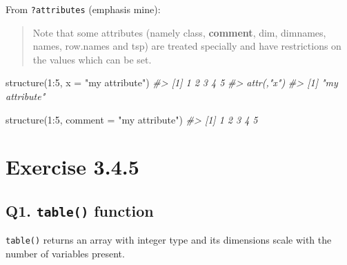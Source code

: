 \documentclass[
]{book}
\newenvironment{Shaded}{\begin{snugshade}}{\end{snugshade}}
\newcommand{\AttributeTok}[1]{\textcolor[rgb]{0.77,0.63,0.00}{#1}}
\newcommand{\CommentTok}[1]{\textcolor[rgb]{0.56,0.35,0.01}{\textit{#1}}}
\newcommand{\DecValTok}[1]{\textcolor[rgb]{0.00,0.00,0.81}{#1}}
\newcommand{\FunctionTok}[1]{\textcolor[rgb]{0.00,0.00,0.00}{#1}}
\newcommand{\NormalTok}[1]{#1}
\newcommand{\SpecialCharTok}[1]{\textcolor[rgb]{0.00,0.00,0.00}{#1}}
\newcommand{\StringTok}[1]{\textcolor[rgb]{0.31,0.60,0.02}{#1}}
\begin{document}
From \texttt{?attributes} (emphasis mine):

\begin{quote}
Note that some attributes (namely class, \textbf{comment}, dim, dimnames, names, row.names and tsp) are treated specially and have restrictions on the values which can be set.
\end{quote}

\begin{Shaded}
\begin{Highlighting}[]
\FunctionTok{structure}\NormalTok{(}\DecValTok{1}\SpecialCharTok{:}\DecValTok{5}\NormalTok{, }\AttributeTok{x =} \StringTok{"my attribute"}\NormalTok{)}
\CommentTok{\#\textgreater{} [1] 1 2 3 4 5}
\CommentTok{\#\textgreater{} attr(,"x")}
\CommentTok{\#\textgreater{} [1] "my attribute"}

\FunctionTok{structure}\NormalTok{(}\DecValTok{1}\SpecialCharTok{:}\DecValTok{5}\NormalTok{, }\AttributeTok{comment =} \StringTok{"my attribute"}\NormalTok{)}
\CommentTok{\#\textgreater{} [1] 1 2 3 4 5}
\end{Highlighting}
\end{Shaded}

\hypertarget{exercise-3.4.5}{%
\section{Exercise 3.4.5}\label{exercise-3.4.5}}

\hypertarget{q1.-table-function}{%
\subsection*{\texorpdfstring{Q1. \texttt{table()} function}{Q1. table() function}}\label{q1.-table-function}}

\texttt{table()} returns an array with integer type and its dimensions scale with the number of variables present.
\end{document}
